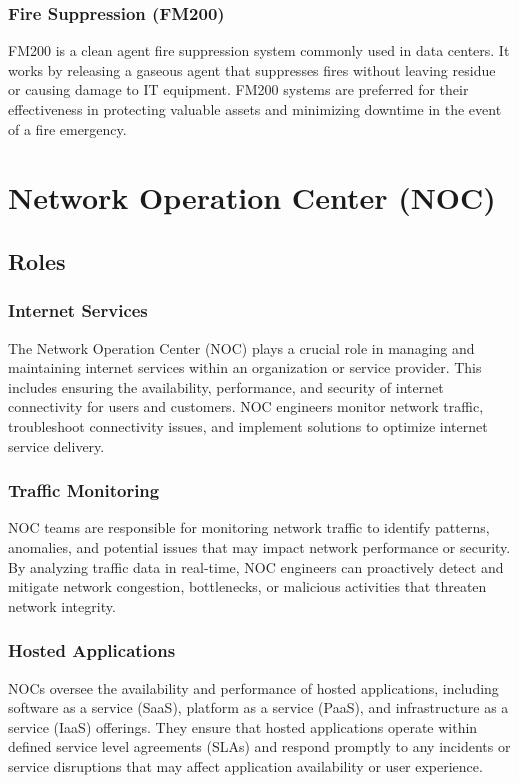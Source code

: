 \documentclass[a4paper,12pt]{report}
\begin{document}
	\subsubsection{Fire Suppression (FM200)}
	FM200 is a clean agent fire suppression system commonly used in data centers. It works by releasing a gaseous agent that suppresses fires without leaving residue or causing damage to IT equipment. FM200 systems are preferred for their effectiveness in protecting valuable assets and minimizing downtime in the event of a fire emergency.
	
	
	\section{Network Operation Center (NOC)}
	
	\subsection{Roles}
	
	\subsubsection{Internet Services}
	The Network Operation Center (NOC) plays a crucial role in managing and maintaining internet services within an organization or service provider. This includes ensuring the availability, performance, and security of internet connectivity for users and customers. NOC engineers monitor network traffic, troubleshoot connectivity issues, and implement solutions to optimize internet service delivery.
	
	\subsubsection{Traffic Monitoring}
	NOC teams are responsible for monitoring network traffic to identify patterns, anomalies, and potential issues that may impact network performance or security. By analyzing traffic data in real-time, NOC engineers can proactively detect and mitigate network congestion, bottlenecks, or malicious activities that threaten network integrity.
	
	\subsubsection{Hosted Applications}
	NOCs oversee the availability and performance of hosted applications, including software as a service (SaaS), platform as a service (PaaS), and infrastructure as a service (IaaS) offerings. They ensure that hosted applications operate within defined service level agreements (SLAs) and respond promptly to any incidents or service disruptions that may affect application availability or user experience.
	
\end{document}
